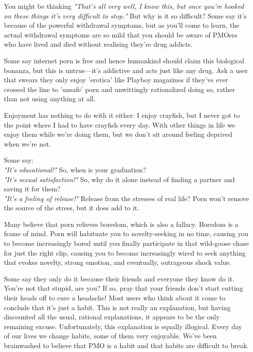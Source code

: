 \documentclass[easypeasy.tex]{subfiles}
\begin{document}
You might be thinking \textit{"That's all very well, I know this, but once you're hooked on these things it's very difficult to stop."} But why is it so difficult? Some say it's because of the powerful withdrawal symptoms, but as you'll come to learn, the actual withdrawal symptoms are so mild that you should be aware of PMOers who have lived and died without realising they're drug addicts.

Some say internet porn is free and hence humankind should claim this biological bonanza, but this is untrue—it's addictive and acts just like any drug. Ask a user that swears they only enjoy 'erotica' like Playboy magazines if they've ever crossed the line to 'unsafe' porn and unwittingly rationalized doing so, rather than not using anything at all.

Enjoyment has nothing to do with it either: I enjoy crayfish, but I never got to the point where I had to have crayfish every day. With other things in life we enjoy them while we're doing them, but we don't sit around feeling deprived when we're not.

Some say:\\
  \textit{"It's educational!"} So, when is your graduation?\\
  \textit{"It's sexual satisfaction!"} So, why do it alone instead of finding a partner and saving it for them?\\
  \textit{"It's a feeling of release!"} Release from the stresses of real life? Porn won't remove the source of the stress, but it does add to it.

Many believe that porn relieves boredom, which is also a fallacy. Boredom is a frame of mind. Porn will habituate you to novelty-seeking in no time, causing you to become increasingly bored until you finally participate in that wild-goose chase for just the right clip, causing you to become increasingly wired to seek anything that evokes novelty, strong emotion, and eventually, outrageous shock value.

Some say they only do it because their friends and everyone they know do it. You're not that stupid, are you? If so, pray that your friends don't start cutting their heads off to cure a headache! Most users who think about it come to conclude that it's just a habit. This is not really an explanation, but having discounted all the usual, rational explanations, it appears to be the only remaining excuse. Unfortunately, this explanation is equally illogical. Every day of our lives we change habits, some of them very enjoyable. We've been brainwashed to believe that PMO is a habit and that habits are difficult to break.
\end{document}
